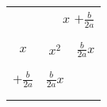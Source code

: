 \documentclass{standalone}
\begin{document}
\begin{tabular}{c|c|c|}
	\multicolumn{3}{r}{$x$ \hspace{.1in} ${\displaystyle +\frac{b}{2a}}$} \\ 
	\multicolumn{3}{r}{} \\ \cline{2-3}
	& & \\
	$x$ & $x^2 $ & ${\displaystyle \frac{b}{2a}}x$ \\
	& & \\ \cline{2-3}
	& & \\
	$ {\displaystyle + \frac{b}{2a}}$ &  ${\displaystyle \frac{b}{2a}}x$  &  \\
	& & \\ \cline{2-3}
	\multicolumn{3}{r}{} \\
\end{tabular}

\vspace{1em}
\end{document}
